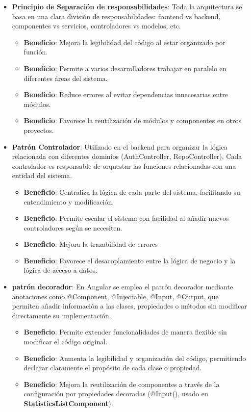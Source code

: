 \begin{itemize}
    \item \textbf{Principio de Separación de responsabilidades}: Toda la arquitectura se basa en una clara división de responsabilidades: frontend vs backend, componentes vs servicios, controladores vs modelos, etc.
    \begin{itemize}
        \item \textbf{Beneficio}: Mejora la legibilidad del código al estar organizado por función.
        \item \textbf{Beneficio}: Permite a varios desarrolladores trabajar en paralelo en diferentes áreas del sistema.
        \item \textbf{Beneficio}: Reduce errores al evitar dependencias innecesarias entre módulos.
        \item \textbf{Beneficio}: Favorece la reutilización de módulos y componentes en otros proyectos.
    \end{itemize}
    
    \item \textbf{Patrón Controlador}: Utilizado en el backend para organizar la lógica relacionada con diferentes dominios (AuthController, RepoController). Cada controlador es responsable de orquestar las funciones relacionadas con una entidad del sistema.
    \begin{itemize}
        \item \textbf{Beneficio}: Centraliza la lógica de cada parte del sistema, facilitando su entendimiento y modificación.
        \item \textbf{Beneficio}: Permite escalar el sistema con facilidad al añadir nuevos controladores según se necesiten.
        \item \textbf{Beneficio}: Mejora la trazabilidad de errores
        \item \textbf{Beneficio}: Favorece el desacoplamiento entre la lógica de negocio y la lógica de acceso a datos.
    \end{itemize}
    
    \item \textbf{patrón decorador}: En Angular se emplea el patrón decorador mediante anotaciones como @Component, @Injectable, @Input, @Output, que permiten añadir información a las clases, propiedades o métodos sin modificar directamente su implementación.
    \begin{itemize}
        \item \textbf{Beneficio}: Permite extender funcionalidades de manera flexible sin modificar el código original.
        \item \textbf{Beneficio}: Aumenta la legibilidad y organización del código, permitiendo declarar claramente el propósito de cada clase o propiedad.
        \item \textbf{Beneficio}: Mejora la reutilización de componentes a través de la configuración por propiedades decoradas (@Input(), usado en \textbf{StatisticsListComponent}).
    \end{itemize}
\end{itemize}

